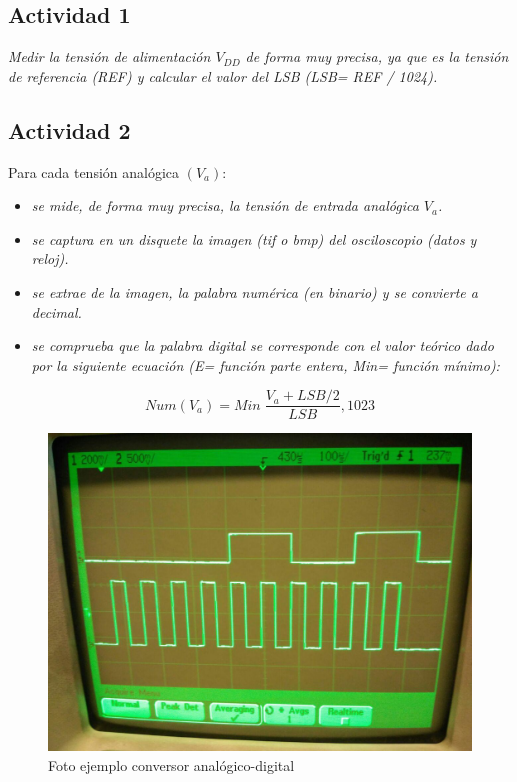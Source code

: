 \documentclass[paper=a4, fontsize=11pt]{scrartcl} %
\numberwithin{equation}{section} %
\numberwithin{figure}{section} %
\numberwithin{table}{section} %
\begin{document}
\subsection{Actividad 1}

\textit{Medir la tensión de alimentación $ V_{DD} $ de forma muy precisa, ya que es la tensión de referencia (REF) y calcular el valor del LSB (LSB= REF / 1024).}

\subsection{Actividad 2}

Para cada tensión analógica $ (V_{a}) $:

\begin{itemize}
	\item \textit{se mide, de forma muy precisa, la tensión de entrada analógica $ V_{a} $.}
	\item \textit{se captura en un disquete la imagen (tif o bmp) del osciloscopio (datos y reloj).}
	\item \textit{se extrae de la imagen, la palabra numérica (en binario) y se convierte a decimal.}
	\item \textit{se comprueba que la palabra digital se corresponde con el valor teórico dado por la siguiente ecuación (E= función parte entera, Min= función mínimo):}
\end{itemize}

$$ Num(V_{a})=Min \; \dfrac{V_{a}+LSB/2}{LSB},1023 $$

\begin{figure}[H]
	\centering
	\includegraphics[scale=0.4]{image/prac61}
	\caption{Foto ejemplo conversor analógico-digital}
	\label{fig:prac-5a-61}
\end{figure}
\end{document}
